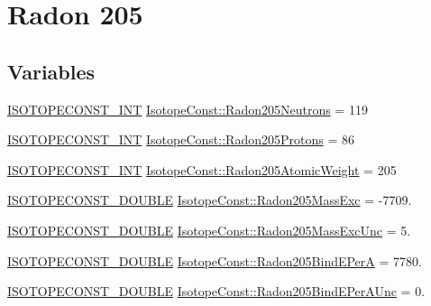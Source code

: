 \hypertarget{group___isotope_const-_radon-_rn205}{}\section{Radon 205}
\label{group___isotope_const-_radon-_rn205}
\subsection*{Variables}
\begin{DoxyCompactItemize}
\item 
\mbox{\hyperlink{group___isotope_const-_macros_ga5f18360b3e99483a35c32d789e62621c}{I\+S\+O\+T\+O\+P\+E\+C\+O\+N\+S\+T\+\_\+\+I\+NT}} \mbox{\hyperlink{group___isotope_const-_radon-_rn205_ga4e5659abc2ab9280d19051e8fffcdf98}{Isotope\+Const\+::\+Radon205\+Neutrons}} = 119
\item 
\mbox{\hyperlink{group___isotope_const-_macros_ga5f18360b3e99483a35c32d789e62621c}{I\+S\+O\+T\+O\+P\+E\+C\+O\+N\+S\+T\+\_\+\+I\+NT}} \mbox{\hyperlink{group___isotope_const-_radon-_rn205_gac79a8c3fd8f7d9f11c702bc7c6ad89b7}{Isotope\+Const\+::\+Radon205\+Protons}} = 86
\item 
\mbox{\hyperlink{group___isotope_const-_macros_ga5f18360b3e99483a35c32d789e62621c}{I\+S\+O\+T\+O\+P\+E\+C\+O\+N\+S\+T\+\_\+\+I\+NT}} \mbox{\hyperlink{group___isotope_const-_radon-_rn205_ga55e746c24f024593173c4d4190121607}{Isotope\+Const\+::\+Radon205\+Atomic\+Weight}} = 205
\item 
\mbox{\hyperlink{group___isotope_const-_macros_ga8f45a7272ce02c0b4c65c44636ed719a}{I\+S\+O\+T\+O\+P\+E\+C\+O\+N\+S\+T\+\_\+\+D\+O\+U\+B\+LE}} \mbox{\hyperlink{group___isotope_const-_radon-_rn205_ga1ff7a187ede77ea3c4f9d3d4a994487f}{Isotope\+Const\+::\+Radon205\+Mass\+Exc}} = -\/7709.
\item 
\mbox{\hyperlink{group___isotope_const-_macros_ga8f45a7272ce02c0b4c65c44636ed719a}{I\+S\+O\+T\+O\+P\+E\+C\+O\+N\+S\+T\+\_\+\+D\+O\+U\+B\+LE}} \mbox{\hyperlink{group___isotope_const-_radon-_rn205_ga05fb06fcb9f31a5b612fb806871acbff}{Isotope\+Const\+::\+Radon205\+Mass\+Exc\+Unc}} = 5.
\item 
\mbox{\hyperlink{group___isotope_const-_macros_ga8f45a7272ce02c0b4c65c44636ed719a}{I\+S\+O\+T\+O\+P\+E\+C\+O\+N\+S\+T\+\_\+\+D\+O\+U\+B\+LE}} \mbox{\hyperlink{group___isotope_const-_radon-_rn205_gabf20ab608bae12ca838589d98095aec8}{Isotope\+Const\+::\+Radon205\+Bind\+E\+PerA}} = 7780.
\item 
\mbox{\hyperlink{group___isotope_const-_macros_ga8f45a7272ce02c0b4c65c44636ed719a}{I\+S\+O\+T\+O\+P\+E\+C\+O\+N\+S\+T\+\_\+\+D\+O\+U\+B\+LE}} \mbox{\hyperlink{group___isotope_const-_radon-_rn205_ga027b169bdac416d73e501365e09290a3}{Isotope\+Const\+::\+Radon205\+Bind\+E\+Per\+A\+Unc}} = 0.

\end{DoxyCompactItemize}
